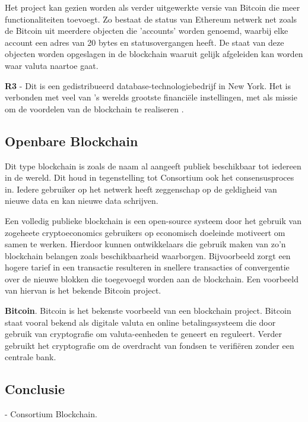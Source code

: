 Het project kan gezien worden als verder uitgewerkte versie van Bitcoin die meer functionaliteiten toevoegt. Zo bestaat de status van Ethereum netwerk net zoals de Bitcoin uit meerdere objecten die 'accounts' worden genoemd, waarbij elke account een adres van 20 bytes en statusovergangen heeft. De staat van deze objecten worden opgeslagen in de blockchain waaruit gelijk afgeleiden kan worden waar valuta naartoe gaat.\cite{whitePaperEthereum}

\textbf{R3} - Dit is een gedistribueerd database-technologiebedrijf in New York. Het is verbonden met veel van 's werelds grootste financiële instellingen, met als missie om de voordelen van de blockchain te realiseren \cite{R3}.

\subsection{Openbare Blockchain}
Dit type blockchain is zoals de naam al aangeeft publiek beschikbaar tot iedereen in de wereld. Dit houd in tegenstelling tot Consortium ook het consensusproces in. Iedere gebruiker op het netwerk heeft zeggenschap op de geldigheid van nieuwe data en kan nieuwe data schrijven. \par

Een volledig publieke blockchain is een open-source systeem door het gebruik van zogeheete cryptoeconomics gebruikers op economisch doeleinde motiveert om samen te werken. Hierdoor kunnen ontwikkelaars die gebruik maken van zo'n blockchain belangen zoals beschikbaarheid waarborgen. Bijvoorbeeld zorgt een hogere tarief in een transactie resulteren in snellere transacties of convergentie over de nieuwe blokken die toegevoegd worden aan de blockchain. Een voorbeeld van hiervan is het bekende Bitcoin project.

\textbf{Bitcoin}. Bitcoin is het bekenste voorbeeld van een blockchain project. Bitcoin staat vooral bekend als digitale valuta en online betalingssysteem die door gebruik van cryptografie om valuta-eenheden te geneert en reguleert. Verder gebruikt het cryptografie om de overdracht van fondsen te verifiëren zonder een centrale bank. \par

\subsection{Conclusie}
- Consortium Blockchain.

\newpage